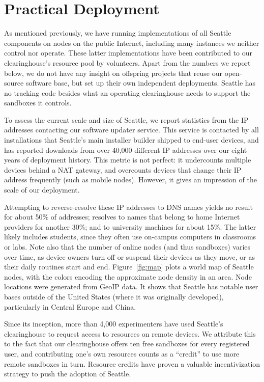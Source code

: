 \section{Practical Deployment}\label{sec-deployment}

As mentioned previously, we have running implementations of all
Seattle components on nodes on the public Internet, including
many instances we neither control nor operate. These latter
implementations have been
contributed to our clearinghouse's resource pool by volunteers.
Apart from the numbers we report below, we do not have any
insight on offspring projects that reuse our open-source software
base, but set up their own independent deployments.
Seattle has no tracking code besides what an operating clearinghouse
needs to support the sandboxes it controls.

To assess the current scale and size of Seattle, we report
statistics from the \gls{IP} addresses contacting our software
updater service. This service is contacted
by all installations that Seattle's main installer builder shipped
to end-user devices, and has reported downloads from over 40,000
different \gls{IP} addresses over our eight years of deployment history.
This metric is not perfect: it undercounts multiple devices behind
a \gls{NAT} gateway, and overcounts devices that change their
\gls{IP} address frequently (such as mobile nodes). However, it
gives an impression of the scale of our deployment.

Attempting to reverse-resolve these \gls{IP} addresses to \gls{DNS}
names yields no result for about 50\% of addresses; resolves to
names that belong to home Internet providers for another 30\%; and to university
machines for about 15\%. The latter likely includes students, since they
often use on-campus computers in classrooms or labs. Note also that the number
of online nodes (and thus sandboxes) varies over time, as device owners
turn off or suspend their devices as they move, or as their daily
routines start and end.
Figure~\ref{fig:map} plots a world map of Seattle nodes, with the
colors encoding the approximate node density in an area.
Node locations were generated from GeoIP data.
It shows that Seattle has notable user bases outside of the
United States (where it was originally developed),
particularly in Central Europe and China.

Since its inception,
more than 4,000 experimenters have used Seattle's clearinghouse
to request access to resources on remote devices. We attribute this
to the fact that our clearinghouse offers ten free sandboxes for
every registered user, and contributing one's own resources counts
as a ``credit'' to use more remote sandboxes in turn.
Resource credits have proven a valuable incentivization strategy
to push the adoption of Seattle.

